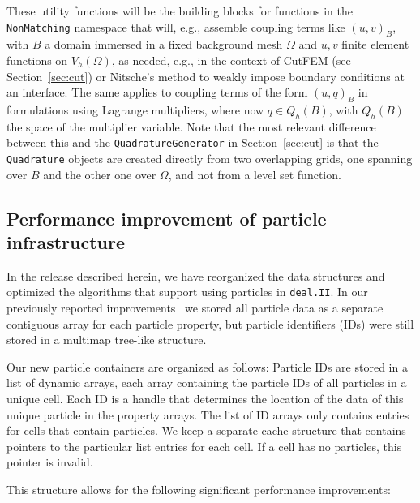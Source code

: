 \documentclass{ansarticle-preprint}
\newcommand{\specialword}[1]{\texttt{#1}}
\newcommand{\dealii}{{\specialword{deal.II}}\xspace}
\begin{document}
These utility functions will be the building blocks for functions in the \texttt{NonMatching} namespace that will, e.g.,  assemble coupling terms like $(u,v)_{B}$, with $B$ a domain immersed in a fixed background mesh $\Omega$ and $u,v$ finite element functions on $V_h(\Omega)$, as needed, e.g., in 
the context of CutFEM (see Section~\ref{sec:cut}) or Nitsche's method to weakly impose boundary conditions at an interface. The same applies to coupling terms of the form $(u,q)_B$ in formulations using Lagrange multipliers, where now $q \in Q_h(B)$, with $Q_h(B)$ the space of the multiplier variable.
Note that the most relevant difference between this and the \texttt{QuadratureGenerator} in Section~\ref{sec:cut} is that the \texttt{Quadrature} objects are created directly from two overlapping grids, one
spanning over $B$ and the other one over $\Omega$, and not from a level set function.



\subsection{Performance improvement of particle infrastructure}\label{sec:particles}

In the release described herein, we have reorganized the data
structures and optimized the algorithms that support using particles
in \dealii{}. In our previously reported improvements~\citep{dealII93} we stored all particle data as a separate contiguous array for each particle property, but particle identifiers (IDs) were still stored in a multimap tree-like structure.

Our new particle containers are organized as follows: Particle IDs are stored in a list of dynamic arrays, each array containing the particle IDs of all particles in a unique cell. Each ID is a handle that determines the location of the data of this unique particle in the property arrays.
The list of ID arrays only contains entries for cells that contain particles. We keep a separate cache structure that contains pointers to the particular list entries for each cell. If a cell has no particles, this pointer is invalid.

This structure allows for the following significant performance improvements:
\end{document}
